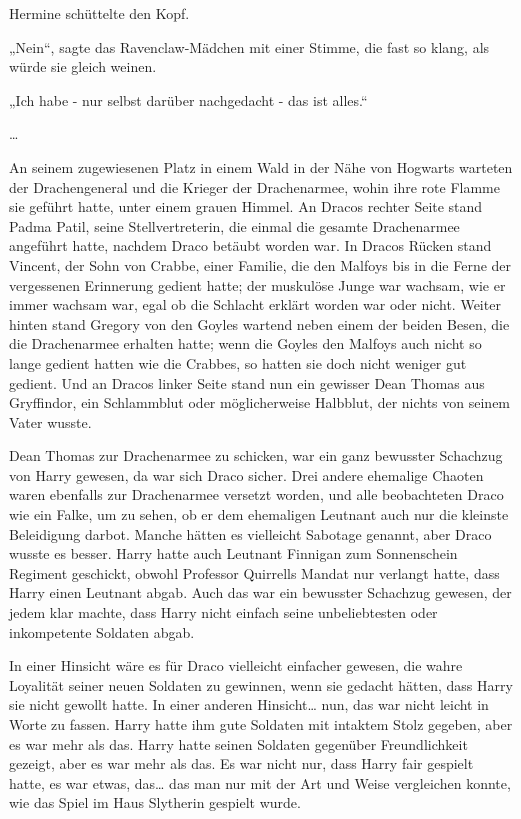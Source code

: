 {Hermine schüttelte den Kopf.

„Nein“, sagte das Ravenclaw-Mädchen mit einer Stimme, die fast so klang, als würde sie gleich weinen.

„Ich habe - nur selbst darüber nachgedacht - das ist alles.“

…

An seinem zugewiesenen Platz in einem Wald in der Nähe von Hogwarts warteten der Drachengeneral und die Krieger der Drachenarmee, wohin ihre rote Flamme sie geführt hatte, unter einem grauen Himmel. An Dracos rechter Seite stand Padma Patil, seine Stellvertreterin, die einmal die gesamte Drachenarmee angeführt hatte, nachdem Draco betäubt worden war. In Dracos Rücken stand Vincent, der Sohn von Crabbe, einer Familie, die den Malfoys bis in die Ferne der vergessenen Erinnerung gedient hatte; der muskulöse Junge war wachsam, wie er immer wachsam war, egal ob die Schlacht erklärt worden war oder nicht. Weiter hinten stand Gregory von den Goyles wartend neben einem der beiden Besen, die die Drachenarmee erhalten hatte; wenn die Goyles den Malfoys auch nicht so lange gedient hatten wie die Crabbes, so hatten sie doch nicht weniger gut gedient. Und an Dracos linker Seite stand nun ein gewisser Dean Thomas aus Gryffindor, ein Schlammblut oder möglicherweise Halbblut, der nichts von seinem Vater wusste.

Dean Thomas zur Drachenarmee zu schicken, war ein ganz bewusster Schachzug von Harry gewesen, da war sich Draco sicher. Drei andere ehemalige Chaoten waren ebenfalls zur Drachenarmee versetzt worden, und alle beobachteten Draco wie ein Falke, um zu sehen, ob er dem ehemaligen Leutnant auch nur die kleinste Beleidigung darbot. Manche hätten es vielleicht Sabotage genannt, aber Draco wusste es besser. Harry hatte auch Leutnant Finnigan zum Sonnenschein Regiment geschickt, obwohl Professor Quirrells Mandat nur verlangt hatte, dass Harry einen Leutnant abgab. Auch das war ein bewusster Schachzug gewesen, der jedem klar machte, dass Harry nicht einfach seine unbeliebtesten oder inkompetente Soldaten abgab.

In einer Hinsicht wäre es für Draco vielleicht einfacher gewesen, die wahre Loyalität seiner neuen Soldaten zu gewinnen, wenn sie gedacht hätten, dass Harry sie nicht gewollt hatte. In einer anderen Hinsicht… nun, das war nicht leicht in Worte zu fassen. Harry hatte ihm gute Soldaten mit intaktem Stolz gegeben, aber es war mehr als das. Harry hatte seinen Soldaten gegenüber Freundlichkeit gezeigt, aber es war mehr als das. Es war nicht nur, dass Harry fair gespielt hatte, es war etwas, das… das man nur mit der Art und Weise vergleichen konnte, wie das Spiel im Haus Slytherin gespielt wurde.

}
